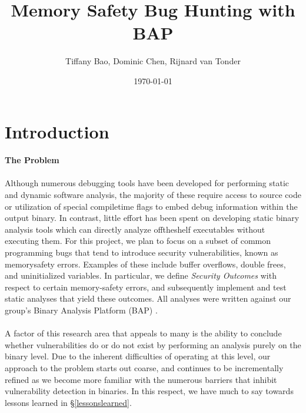 \documentclass[letterpaper,11pt]{article}
\begin{document}
\date{\today}

\title{\Large \bf Memory Safety Bug Hunting with BAP} 

\author{Tiffany Bao, Dominic Chen, Rijnard van Tonder}

\maketitle

\section{Introduction}
\label{intro}

\paragraph{The Problem}

\paragraph{}
Although numerous debugging tools have been developed for performing static and
dynamic software analysis, the majority of these require access to source
code or utilization of special compile­time flags to embed debug information
within the output binary. In contrast, little effort has been spent on
developing static binary analysis tools which can directly analyze
off­the­shelf executables without executing them. For this project, we plan to
focus on a subset of common programming bugs that tend to introduce security
vulnerabilities, known as memory­safety errors. Examples of these include
buffer overflows, double frees, and uninitialized variables. In particular, we
define \emph{Security Outcomes} with respect to certain memory-safety errors,
and subsequently implement and test static analyses that yield these outcomes.
All analyses were written against our group's Binary Analysis Platform
(BAP) \cite{bap, brumley2011bap}.

\paragraph{}
A factor of this research area that appeals to many is the ability to
conclude whether vulnerabilities do or do not exist by performing
an analysis purely on the binary level. Due to the inherent difficulties
of operating at this level, %
our approach to the problem starts out coarse, and continues to be
incrementally refined as we become more familiar with the numerous
barriers that inhibit vulnerability detection in binaries. In this respect,
we have much to say towards lessons learned in \S\ref{lessonslearned}.
\end{document}
